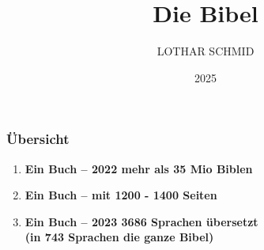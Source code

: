 \documentclass[aspectratio=43]{beamer}
\title{Die Bibel}
\author{\MakeUppercase{Lothar Schmid}}
\date{2025}
\begin{document}
\begin{frame}
    \maketitle    
\end{frame}
\begin{frame}
    \frametitle{Übersicht}  %
    \begin{enumerate}
        \item \textbf{Ein Buch -- 2022 mehr als 35 Mio Biblen}
        
        \item \textbf{\color{gray}Ein Buch -- mit 1200 - 1400 Seiten}
      
        \item \textbf{\color{gray}Ein Buch -- 2023 3686 Sprachen übersetzt\\
        (in 743 Sprachen die ganze Bibel)}
                         
    \end{enumerate}   
\end{frame}
\end{document}
